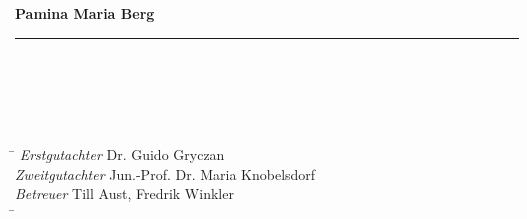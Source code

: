 \begin{titlepage}
\vspace*{5.5ex}

	\noindent \textbf{Pamina Maria Berg}\\
	\noindent \rule{\textwidth}{0.4mm} 
	 \\
	 \\
	 \\
	 \\
\begin{tabbing}
\hspace{10em} \=  \kill
\emph{Erstgutachter} \> Dr. Guido Gryczan \\
\emph{Zweitgutachter} \> Jun.-Prof. Dr. Maria Knobelsdorf \\
\emph{Betreuer} \> Till Aust, Fredrik Winkler \\
 \hspace{10em} \=  \kill
\end{tabbing}

\end{titlepage}
